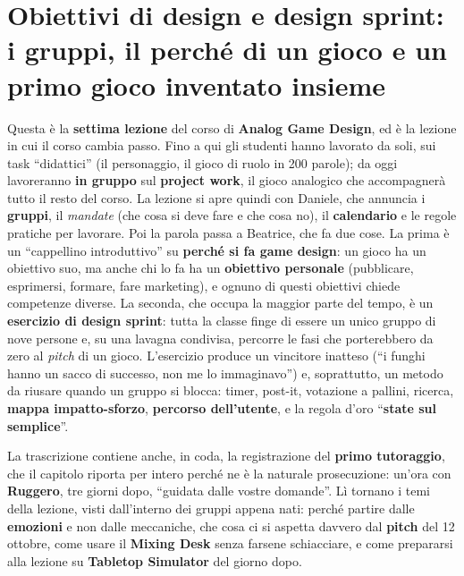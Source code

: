 \chapter[Obiettivi di design e design sprint]{Obiettivi di design e design
sprint: i gruppi, il perché di un gioco e un primo gioco inventato insieme}
\label{a7:cap:sprint}

Questa è la \textbf{settima lezione} del corso di \textbf{Analog Game Design}, ed è
la lezione in cui il corso cambia passo. Fino a qui gli studenti hanno lavorato da
soli, sui task ``didattici'' (il personaggio, il gioco di ruolo in 200 parole); da
oggi lavoreranno \textbf{in gruppo} sul \textbf{project work}, il gioco analogico
che accompagnerà tutto il resto del corso. La lezione si apre quindi con Daniele,
che annuncia i \textbf{gruppi}, il \emph{mandate} (che cosa si deve fare e che cosa
no), il \textbf{calendario} e le regole pratiche per lavorare. Poi la parola passa a
Beatrice, che fa due cose. La prima è un ``cappellino introduttivo'' su
\textbf{perché si fa game design}: un gioco ha un obiettivo suo, ma anche chi lo fa
ha un \textbf{obiettivo personale} (pubblicare, esprimersi, formare, fare
marketing), e ognuno di questi obiettivi chiede competenze diverse. La seconda, che
occupa la maggior parte del tempo, è un \textbf{esercizio di design sprint}: tutta
la classe finge di essere un unico gruppo di nove persone e, su una lavagna
condivisa, percorre le fasi che porterebbero da zero al \emph{pitch} di un gioco.
L'esercizio produce un vincitore inatteso (``i funghi hanno un sacco di successo,
non me lo immaginavo'') e, soprattutto, un metodo da riusare quando un gruppo si
blocca: timer, post-it, votazione a pallini, ricerca, \textbf{mappa impatto-sforzo},
\textbf{percorso dell'utente}, e la regola d'oro ``\textbf{state sul semplice}''.

La trascrizione contiene anche, in coda, la registrazione del \textbf{primo
tutoraggio}, che il capitolo riporta per intero perché ne è la naturale
prosecuzione: un'ora con \textbf{Ruggero}, tre giorni dopo, ``guidata dalle vostre
domande''. Lì tornano i temi della lezione, visti dall'interno dei gruppi appena
nati: perché partire dalle \textbf{emozioni} e non dalle meccaniche, che cosa ci si
aspetta davvero dal \textbf{pitch} del 12 ottobre, come usare il \textbf{Mixing
Desk} senza farsene schiacciare, e come prepararsi alla lezione su
\textbf{Tabletop Simulator} del giorno dopo.

